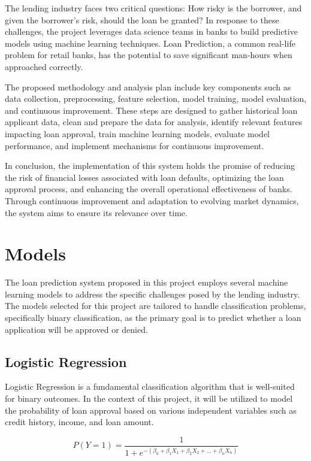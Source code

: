\documentclass[10pt]{article}
\begin{document}
The lending industry faces two critical questions: How risky is the borrower, and given the borrower's risk, should the loan be granted? In response to these challenges, the project leverages data science teams in banks to build predictive models using machine learning techniques. Loan Prediction, a common real-life problem for retail banks, has the potential to save significant man-hours when approached correctly.

The proposed methodology and analysis plan include key components such as data collection, preprocessing, feature selection, model training, model evaluation, and continuous improvement. These steps are designed to gather historical loan applicant data, clean and prepare the data for analysis, identify relevant features impacting loan approval, train machine learning models, evaluate model performance, and implement mechanisms for continuous improvement.

In conclusion, the implementation of this system holds the promise of reducing the risk of financial losses associated with loan defaults, optimizing the loan approval process, and enhancing the overall operational effectiveness of banks. Through continuous improvement and adaptation to evolving market dynamics, the system aims to ensure its relevance over time.

\section*{Models}

The loan prediction system proposed in this project employs several machine learning models to address the specific challenges posed by the lending industry. The models selected for this project are tailored to handle classification problems, specifically binary classification, as the primary goal is to predict whether a loan application will be approved or denied.

\subsection*{Logistic Regression}

Logistic Regression is a fundamental classification algorithm that is well-suited for binary outcomes. In the context of this project, it will be utilized to model the probability of loan approval based on various independent variables such as credit history, income, and loan amount.

\[
P(Y=1) = \frac{1}{1 + e^{-(\beta_0 + \beta_1X_1 + \beta_2X_2 + \ldots + \beta_nX_n)}}
\]
\end{document}
